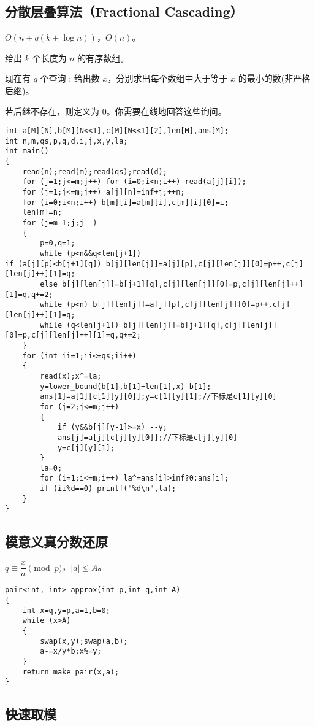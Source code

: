 \documentclass[12pt]{ctexart}
\begin{document}
\subsection{分散层叠算法（Fractional Cascading）}

$O(n+q(k+\log n))$，$O(n)$。

给出 $k$ 个长度为 $n$ 的有序数组。

现在有 $q$ 个查询 : 给出数 $x$，分别求出每个数组中大于等于 $x$ 的最小的数(非严格后继)。

若后继不存在，则定义为 $0$。你需要在线地回答这些询问。

\begin{lstlisting}
int a[M][N],b[M][N<<1],c[M][N<<1][2],len[M],ans[M];
int n,m,qs,p,q,d,i,j,x,y,la;
int main()
{
	read(n);read(m);read(qs);read(d);
	for (j=1;j<=m;j++) for (i=0;i<n;i++) read(a[j][i]);
	for (j=1;j<=m;j++) a[j][n]=inf+j;++n;
	for (i=0;i<n;i++) b[m][i]=a[m][i],c[m][i][0]=i;
	len[m]=n;
	for (j=m-1;j;j--)
	{
		p=0,q=1;
		while (p<n&&q<len[j+1]) 
if (a[j][p]<b[j+1][q]) b[j][len[j]]=a[j][p],c[j][len[j]][0]=p++,c[j][len[j]++][1]=q;
		else b[j][len[j]]=b[j+1][q],c[j][len[j]][0]=p,c[j][len[j]++][1]=q,q+=2;
		while (p<n) b[j][len[j]]=a[j][p],c[j][len[j]][0]=p++,c[j][len[j]++][1]=q;
		while (q<len[j+1]) b[j][len[j]]=b[j+1][q],c[j][len[j]][0]=p,c[j][len[j]++][1]=q,q+=2;
	}
	for (int ii=1;ii<=qs;ii++)
	{
		read(x);x^=la;
		y=lower_bound(b[1],b[1]+len[1],x)-b[1];
		ans[1]=a[1][c[1][y][0]];y=c[1][y][1];//下标是c[1][y][0]
		for (j=2;j<=m;j++) 
		{
			if (y&&b[j][y-1]>=x) --y;
			ans[j]=a[j][c[j][y][0]];//下标是c[j][y][0]
			y=c[j][y][1];
		}
		la=0;
		for (i=1;i<=m;i++) la^=ans[i]>inf?0:ans[i];
		if (ii%d==0) printf("%d\n",la);
	}
}
\end{lstlisting}

\subsection{模意义真分数还原}

$q\equiv \dfrac{x}{a}\pmod p$，$|a|\le A$。

\begin{lstlisting}
pair<int, int> approx(int p,int q,int A)
{
	int x=q,y=p,a=1,b=0;
	while (x>A)
	{
		swap(x,y);swap(a,b);
		a-=x/y*b;x%=y;
	}
	return make_pair(x,a);
}
\end{lstlisting}

\subsection{快速取模}
\end{document}
